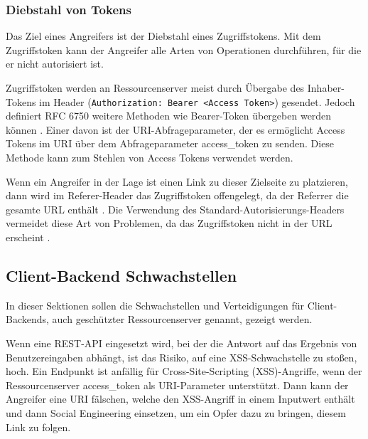 \subsubsection{Diebstahl von Tokens}

Das Ziel eines Angreifers ist der Diebstahl eines Zugriffstokens. Mit dem Zugriffstoken kann der Angreifer alle Arten von Operationen durchführen, für die er nicht autorisiert ist. 

Zugriffstoken werden an Ressourcenserver meist durch Übergabe des Inhaber-Tokens im Header (\texttt{Authorization: Bearer <Access Token>}) gesendet. Jedoch definiert RFC 6750 weitere Methoden wie Bearer-Token übergeben werden können \cite{RFC6750}. Einer davon ist der URI-Abfrageparameter, der es ermöglicht Access Tokens im URI über dem Abfrageparameter access\_token zu senden. Diese Methode kann zum Stehlen von Access Tokens verwendet werden. 


Wenn ein Angreifer in der Lage ist einen Link zu dieser Zielseite zu platzieren, dann wird im Referer-Header das Zugriffstoken offengelegt, da der Referrer die gesamte URL enthält  \cite{OAuth2inAction}. Die Verwendung des Standard-Autorisierungs-Headers vermeidet diese Art von Problemen, da das Zugriffstoken nicht in der URL erscheint \cite{OAuth2inAction}.

\subsection{Client-Backend Schwachstellen}

In dieser Sektionen sollen die Schwachstellen und Verteidigungen für Client-Backends, auch geschützter Ressourcenserver genannt, gezeigt werden. 



Wenn eine REST-API eingesetzt wird, bei der die Antwort auf das Ergebnis von Benutzereingaben abhängt, ist das Risiko, auf eine XSS-Schwachstelle zu stoßen, hoch. Ein Endpunkt ist anfällig für Cross-Site-Scripting (XSS)-Angriffe, wenn der Ressourcenserver access\_token als URI-Parameter unterstützt. Dann kann der Angreifer eine URI fälschen, welche den XSS-Angriff in einem Inputwert enthält und dann Social Engineering einsetzen, um ein Opfer dazu zu bringen, diesem Link zu folgen. \cite{OAuth2inAction}

